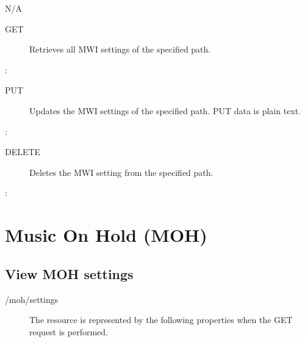 \documentclass[letterpaper,10pt,english]{sphinxmanual}
\begin{document}
 N/A
\begin{description}
\item[{ GET}] \leavevmode
Retrieves all MWI settings of the specified path.

\end{description}

:

\begin{sphinxVerbatim}[commandchars=\\\{\}]
\end{sphinxVerbatim}
\begin{description}
\item[{ PUT}] \leavevmode
Updates the MWI settings of the specified path. PUT data is plain text.

\end{description}

:

\begin{sphinxVerbatim}[commandchars=\\\{\}]
\end{sphinxVerbatim}
\begin{description}
\item[{ DELETE}] \leavevmode
Deletes the MWI setting from the specified path.

\end{description}

:

\begin{sphinxVerbatim}[commandchars=\\\{\}]
\end{sphinxVerbatim}


\section{Music On Hold (MOH)}
\label{\detokenize{restapi:music-on-hold-moh}}

\subsection{View MOH settings}
\label{\detokenize{restapi:view-moh-settings}}
 /moh/settings
\begin{description}
\item[{}] \leavevmode
The resource is represented by the following properties when the GET request is performed.

\end{description}
\end{document}
